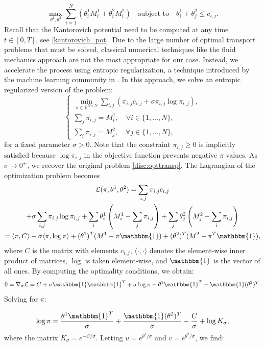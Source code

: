 \documentclass[smallextended,referee,envcountsect,]{svjour3}
\begin{document}
\[
\max_{\theta^1, \theta^2} \sum_{i=1}^N \left( \theta^1_i M^1_i + \theta^2_i M^2_i \right) \quad \text{subject to} \quad \theta^1_i + \theta^2_j \leq c_{i,j}.
\]
Recall that the Kantorovich   potential  need to be computed at  any time $t\in [0,T]$, see \eqref{kantorovich_pot}. Due to the large number of optimal transport problems that must be solved, classical numerical techniques like the fluid mechanics approach \cite{BB00} are not the most appropriate for our case. Instead, we accelerate the process using entropic regularization, a technique introduced by the machine learning community in \cite{Cuturi}. In this approach, we solve an entropic regularized version of the problem:
$$
\left\{
\begin{array}{l}
\min_{\pi \in \mathbb{R}^{N \times N}} \sum_{i,j} \left( \pi_{i,j} c_{i,j} + \sigma \pi_{i,j} \log \pi_{i,j} \right), \\
\sum_{j} \pi_{i,j} = M^1_i, \quad \forall i \in \{1,\ldots,N\}, \\
\sum_{i} \pi_{i,j} = M^2_j, \quad \forall j \in \{1,\ldots,N\},
\end{array}
\right.
$$
for a fixed parameter \(\sigma > 0\). Note that the constraint  \(\pi_{i,j} \geq 0\)  is implicitly satisfied because \(\log \pi_{i,j}\) in the objective function prevents negative \(\pi\) values. As \(\sigma \rightarrow 0^+\), we recover the original problem \eqref{disc:opttransp}. The Lagrangian of the optimization problem becomes
\begin{multline*}
\mathcal{L}(\pi, \theta^1, \theta^2) = \sum_{i,j} \pi_{i,j} c_{i,j}\\
 + \sigma \sum_{i,j} \pi_{i,j} \log \pi_{i,j} + \sum_{i} \theta^1_i \left( M^1_i - \sum_j \pi_{i,j} \right) + \sum_{j} \theta^2_j \left( M^2_j - \sum_i \pi_{i,j} \right) \\
= \langle \pi, C \rangle + \sigma \langle \pi, \log \pi \rangle + (\theta^1)^T (M^1 - \pi \mathbbm{1}) + (\theta^2)^T (M^2 - \pi^T \mathbbm{1}),
\end{multline*}
where \(C\) is the matrix with elements \(c_{i,j}\), \(\langle \cdot, \cdot \rangle\) denotes the element-wise inner product of matrices, \(\log\) is taken element-wise, and \(\mathbbm{1}\) is the vector of all ones. By computing the optimality conditions, we obtain:
\[
0 = \nabla_{\pi} \mathcal{L} = C + \sigma \mathbbm{1} \mathbbm{1}^T + \sigma \log \pi - \theta^1 \mathbbm{1}^T - \mathbbm{1} (\theta^2)^T.
\]
Solving for \(\pi\):

\[
\log \pi = \frac{\theta^1 \mathbbm{1}^T}{\sigma} + \frac{\mathbbm{1} (\theta^2)^T}{\sigma} - \frac{C}{\sigma} + \log K_\sigma,
\]
where the matrix  \(K_\sigma = e^{-C/\sigma}\). Letting \(u = e^{\theta^1/\sigma}\) and \(v = e^{\theta^2/\sigma}\), we find:
\end{document}
